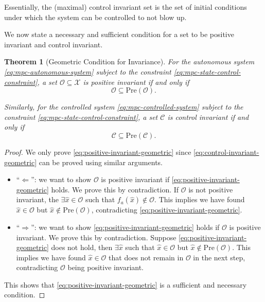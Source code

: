 \documentclass[
]{book}
\newtheorem{theorem}{Theorem}[chapter]
\theoremstyle{definition}
\theoremstyle{definition}
\theoremstyle{definition}
\theoremstyle{definition}
\theoremstyle{remark}
\begin{document}
Essentially, the (maximal) control invariant set is the set of initial conditions under which the system can be controlled to not blow up.

We now state a necessary and sufficient condition for a set to be positive invariant and control invariant.

\begin{theorem}[Geometric Condition for Invariance]
\protect\hypertarget{thm:geometric-condition-for-invariance}{}\label{thm:geometric-condition-for-invariance}For the autonomous system \eqref{eq:mpc-autonomous-system} subject to the constraint \eqref{eq:mpc-state-control-constraint}, a set \(\mathcal{O} \subseteq \mathcal{X}\) is positive invariant if and only if
\begin{equation}
\mathcal{O} \subseteq \text{Pre}(\mathcal{O}).
\label{eq:positive-invariant-geometric}
\end{equation}

Similarly, for the controlled system \eqref{eq:mpc-controlled-system} subject to the constraint \eqref{eq:mpc-state-control-constraint}, a set \(\mathcal{C}\) is control invariant if and only if
\begin{equation}
\mathcal{C} \subseteq \text{Pre}(\mathcal{C}).
\label{eq:control-invariant-geometric}
\end{equation}
\end{theorem}

\begin{proof}
We only prove \eqref{eq:positive-invariant-geometric} since \eqref{eq:control-invariant-geometric} can be proved using similar arguments.

\begin{itemize}
\item
  ``\(\Leftarrow\)'': we want to show \(\mathcal{O}\) is positive invariant if \eqref{eq:positive-invariant-geometric} holds. We prove this by contradiction. If \(\mathcal{O}\) is not positive invariant, the \(\exists \hat{x} \in \mathcal{O}\) such that \(f_a(\hat{x}) \not\in \mathcal{O}\). This implies we have found \(\hat{x} \in \mathcal{O}\) but \(\hat{x} \not\in \text{Pre}(\mathcal{O})\), contradicting \eqref{eq:positive-invariant-geometric}.
\item
  ``\(\Rightarrow\)'': we want to show \eqref{eq:positive-invariant-geometric} holds if \(\mathcal{O}\) is positive invariant. We prove this by contradiction. Suppose \eqref{eq:positive-invariant-geometric} does not hold, then \(\exists \hat{x}\) such that \(\hat{x} \in \mathcal{O}\) but \(\hat{x} \not\in \text{Pre}(\mathcal{O})\). This implies we have found \(\hat{x} \in \mathcal{O}\) that does not remain in \(\mathcal{O}\) in the next step, contradicting \(\mathcal{O}\) being positive invariant.
\end{itemize}

This shows that \eqref{eq:positive-invariant-geometric} is a sufficient and necessary condition.
\end{proof}
\end{document}
